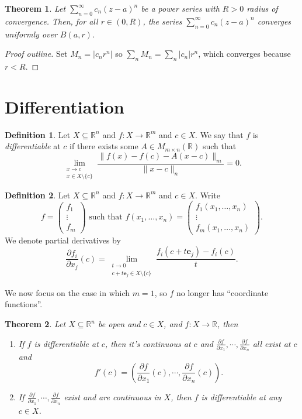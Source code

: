 \documentclass[letterpaper,12pt]{article}
\theoremstyle{definition}
\newtheorem{definition}{Definition}[section]
\theoremstyle{plain}
\newtheorem{thm}{Theorem}[section]
\theoremstyle{remark}
\begin{document}
\begin{thm}
Let $\sum_{n=0}^\infty c_n(z-a)^n$ be a power series with $R>0$ radius of convergence. Then, for all $r\in(0,R)$, the series $\sum_{n=0}^\infty c_n(z-a)^n$ converges \emph{uniformly} over $B(a,r)$.
\end{thm}

\begin{proof}[Proof outline]
Set $M_n = |c_nr^n|$ so $\sum_n M_n = \sum_n |c_n|r^n$, which converges because $r<R$.
\end{proof}

\section{Differentiation}

\begin{definition}\label{defn:Diffble}
Let $X\subseteq \mathbb{R}^n$ and $f:X\to \mathbb{R}^m$ and $c\in X$. We say that $f$ is \emph{differentiable} at $c$ if there exists some $A \in M_{m\times n}(\mathbb{R})$ such that
\[\lim_{\substack{x\to c\\ x\in X\setminus\{c\}}} \frac{\|f(x)-f(c)-A(x-c)\|_m}{\|x-c\|_n} = 0.\]
\end{definition}


\begin{definition}
Let $X\subseteq \mathbb{R}^n$ and $f:X\to \mathbb{R}^m$ and $c\in X$. Write
\[f = \begin{pmatrix}
f_1 \\
\vdots \\
f_m
\end{pmatrix}\text{ such that }f(x_1,\ldots,x_n) = \begin{pmatrix}
f_1(x_1,\ldots,x_n) \\
\vdots \\
f_m(x_1,\ldots,x_n)
\end{pmatrix}.\]
We denote partial derivatives by
\[\frac{\partial f_i}{\partial x_j}(c) = \lim_{\substack{t\to 0\\ c+t\mathbf{e}_j\in X\setminus\{c\}}}\frac{f_i(c+t\mathbf{e}_j)-f_i(c)}{t}.\]
\end{definition}

We now focus on the case in which $m=1$, so $f$ no longer has ``coordinate functions''.

\begin{thm}\label{thm:MainPartialThm}
Let $X\subseteq \mathbb{R}^n$ be open and $c\in X$, and $f:X\to \mathbb{R}$, then
\begin{enumerate}
  \item If $f$ is differentiable at $c$, then it's continuous at $c$ and $\frac{\partial f}{\partial x_1},\cdots,\frac{\partial f}{\partial x_n}$ all exist at $c$ and
  \[f'(c) = \left(\frac{\partial f}{\partial x_1}(c),\cdots,\frac{\partial f}{\partial x_n}(c)\right).\]
  \item If $\frac{\partial f}{\partial x_1},\cdots,\frac{\partial f}{\partial x_n}$ exist and are continuous in $X$, then $f$ is differentiable at any $c\in X$.
\end{enumerate}
\end{thm}
\end{document}
